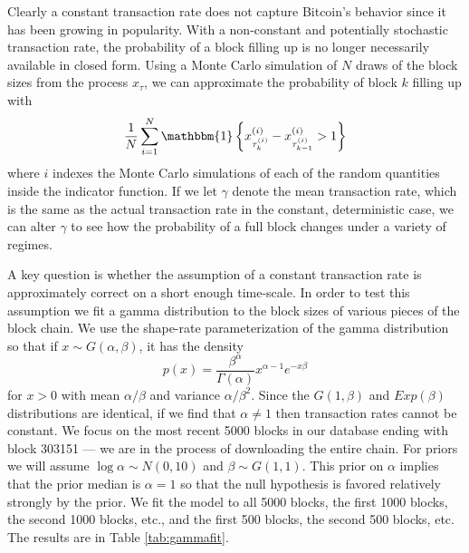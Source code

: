 \documentclass{article}
\begin{document}
Clearly a constant transaction rate does not capture Bitcoin's behavior since it has been growing in popularity. With a non-constant and potentially stochastic transaction rate, the probability of a block filling up is no longer necessarily available in closed form. Using a Monte Carlo simulation of $N$ draws of the block sizes from the process $x_{\tau}$, we can approximate the probability of block $k$ filling up with
\[
\frac{1}{N}\sum_{i=1}^N\mathbbm{1}\left\{x^{(i)}_{\tau_{k}^{(i)}} - x^{(i)}_{\tau_{k-1}^{(i)}} > 1\right\}
\]
where $i$ indexes the Monte Carlo simulations of each of the random quantities inside the indicator function. If we let $\gamma$ denote the mean transaction rate, which is the same as the actual transaction rate in the constant, deterministic case, we can alter $\gamma$ to see how the probability of a full block changes under a variety of regimes.

A key question is whether the assumption of a constant transaction rate is approximately correct on a short enough time-scale. In order to test this assumption we fit a gamma distribution to the block sizes of various pieces of the block chain. We use the shape-rate parameterization of the gamma distribution so that if $x\sim G(\alpha,\beta)$, it has the density
\[
p(x) = \frac{\beta^\alpha}{\Gamma(\alpha)}x^{\alpha-1}e^{-x\beta}
\]
for $x>0$ with mean $\alpha/\beta$ and variance $\alpha/\beta^2$. Since the $G(1,\beta)$ and $Exp(\beta)$ distributions are identical, if we find that $\alpha\neq 1$ then transaction rates cannot be constant. We focus on the most recent 5000 blocks in our database ending with block 303151 --- we are in the process of downloading the entire chain.  For priors we will assume $\log \alpha \sim N(0, 10)$ and $\beta \sim G(1, 1)$. This prior on $\alpha$ implies that the prior median is $\alpha=1$ so that the null hypothesis is favored relatively strongly by the prior. We fit the model to all 5000 blocks, the first 1000 blocks, the second 1000 blocks, etc., and the first 500 blocks, the second 500 blocks, etc. The results are in Table \ref{tab:gammafit}. 
\end{document}
